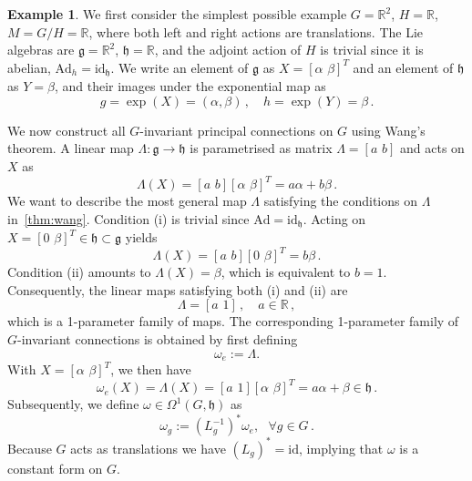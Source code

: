 \documentclass[12pt,a4paper]{article}
\numberwithin{equation}{section}
\newcommand{\id}{\mathrm{id}}
\theoremstyle{plain}
\theoremstyle{definition}
\newtheorem{example}[theorem]{Example}
\theoremstyle{remark}
\begin{document}
\begin{example}\label{ex:wang_R2}
We first consider the simplest possible example $G=\mathbb{R}^2$, $H=\mathbb{R}$, $M=G/H=\mathbb{R}$, where both left and right actions are translations. The Lie algebras are $\mathfrak{g}=\mathbb{R}^2$, $\mathfrak{h} = \mathbb{R}$, and the adjoint action of $H$ is trivial since it is abelian, $\mathrm{Ad}_h=\id_{\mathfrak{h}}$. We write an element of $\mathfrak{g}$ as $X=[\alpha\,\,\beta]^T$ and an element of $\mathfrak{h}$ as $Y=\beta$, and their images under the exponential map as
\begin{equation}
    g = \exp(X) = (\alpha,\beta) \,,\quad h = \exp(Y) = \beta\,.
\end{equation}

We now construct all $G$-invariant principal connections on $G$ using Wang's theorem. A linear map $\Lambda:\mathfrak{g} \to \mathfrak{h}$ is parametrised as matrix $\Lambda = [a\,\,b]$ and acts on $X$ as
\begin{equation}
    \Lambda(X) = [a \,\, b][\alpha \,\, \beta]^T = a\alpha+b\beta \,.
\end{equation}
We want to describe the most general map $\Lambda$ satisfying the conditions on $\Lambda$ in~\cref{thm:wang}. Condition (i) is trivial since $\mathrm{Ad} = \id_{\mathfrak{h}}$. Acting on $X = [0\,\,\beta]^T \in \mathfrak{h} \subset \mathfrak{g}$ yields
\begin{equation}
    \Lambda(X) = [a\,\,b][0\,\,\beta]^T = b\beta\,.
\end{equation}
Condition (ii) amounts to $\Lambda(X) = \beta$, which is equivalent to $b=1$. Consequently, the linear maps satisfying both (i) and (ii) are
\begin{equation}
\label{eqn:wang_maps_R2_example}
    \Lambda = [a\,\,1] \,,\quad a\in\mathbb{R}\,,
\end{equation}
which is a 1-parameter family of maps. The corresponding 1-parameter family of $G$-invariant connections is obtained by first defining
\begin{equation}
    \omega_e := \Lambda.
\end{equation}
With $X = [\alpha\,\,\beta]^T$, we then have
\begin{equation}
    \omega_e(X) = \Lambda(X) = [a\,\,1][\alpha\,\,\beta]^T = a\alpha+\beta \in \mathfrak{h}\,.
\end{equation}
Subsequently, we define $\omega \in \Omega^1(G,\mathfrak{h})$ as
\begin{equation}
\label{eqn:inv_connection_R2_example}
    \omega_g := (L_g^{-1})^* \omega_e, \ \ \ \forall g\in G\,.
\end{equation}
Because $G$ acts as translations we have $(L_g)^* = \id$, implying that $\omega$ is a constant form on $G$.


\end{example}
\end{document}
